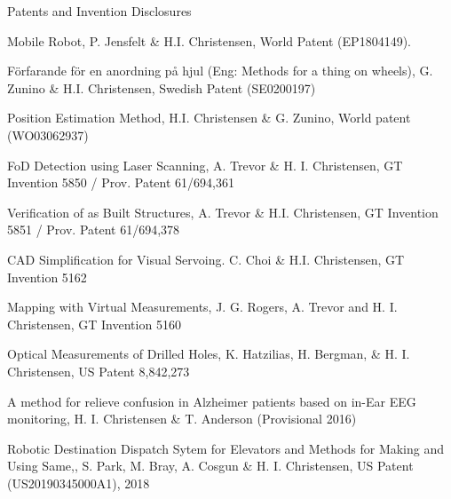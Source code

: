 \documentclass{article}
\begin{document}
\begin{cv}
	\begin{cvlist}{Patents and Invention Disclosures}
		\item Mobile Robot, P. Jensfelt \& H.I. Christensen, World Patent
		(EP1804149).
		\item F{\"o}rfarande f{\"o}r en anordning p{\aa} hjul (Eng: Methods
		for a thing on wheels), G. Zunino \& H.I. Christensen, Swedish
		Patent (SE0200197)
		\item Position Estimation Method, H.I. Christensen \& G. Zunino, World
		patent (WO03062937)
		\item FoD Detection using Laser Scanning, A. Trevor \&
		H. I. Christensen, GT Invention 5850 / Prov. Patent 61/694,361
		\item Verification of as Built Structures, A. Trevor \&
		H.I. Christensen, GT Invention 5851 / Prov. Patent 61/694,378
		\item CAD Simplification for Visual Servoing. C. Choi \&
		H.I. Christensen, GT Invention 5162
		\item Mapping with Virtual Measurements, J. G. Rogers, A. Trevor and
		H. I. Christensen, GT Invention 5160
		\item  Optical Measurements of Drilled Holes, K. Hatzilias, H. Bergman,
		\& H. I. Christensen, US Patent 8,842,273
		\item  A method for relieve confusion in Alzheimer patients based on
		in-Ear EEG monitoring, H. I. Christensen \& T. Anderson
		(Provisional 2016)
		\item Robotic Destination Dispatch Sytem for Elevators and Methods for
		Making and Using Same,, S. Park, M. Bray,  A. Cosgun \& H. I. Christensen, 
		US Patent (US20190345000A1), 2018
	\end{cvlist}




\end{cv}
\end{document}
